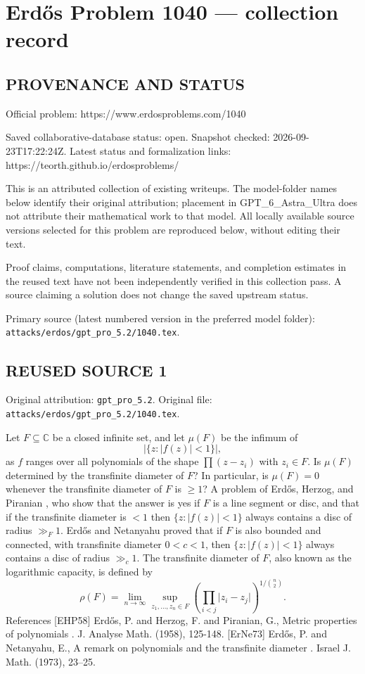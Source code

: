 \section*{Erd\H{o}s Problem 1040 --- collection record}

\subsection*{PROVENANCE AND STATUS}
Official problem: https://www.erdosproblems.com/1040

Saved collaborative-database status: open.
Snapshot checked: 2026-09-23T17:22:24Z.
Latest status and formalization links: https://teorth.github.io/erdosproblems/

This is an attributed collection of existing writeups. The model-folder names below identify their original attribution; placement in GPT\_6\_Astra\_Ultra does not attribute their mathematical work to that model. All locally available source versions selected for this problem are reproduced below, without editing their text.

Proof claims, computations, literature statements, and completion estimates in the reused text have not been independently verified in this collection pass. A source claiming a solution does not change the saved upstream status.

Primary source (latest numbered version in the preferred model folder): \texttt{attacks/erdos/gpt\_pro\_5.2/1040.tex}.

\subsection*{REUSED SOURCE 1}
Original attribution: \texttt{gpt\_pro\_5.2}.
Original file: \texttt{attacks/erdos/gpt\_pro\_5.2/1040.tex}.


Let $F\subseteq \mathbb{C}$ be a closed infinite set, and let $\mu(F)$ be the infimum of\[\lvert \{ z: \lvert f(z)\rvert < 1\}\rvert,\]as $f$ ranges over all polynomials of the shape $\prod (z-z_i)$ with $z_i\in F$. Is $\mu(F)$ determined by the transfinite diameter of $F$? In particular, is $\mu(F)=0$ whenever the transfinite diameter of $F$ is $\geq 1$? A problem of Erd\H{o}s, Herzog, and Piranian \cite{EHP58}, who show that the answer is yes if $F$ is a line segment or disc, and that if the transfinite diameter is $<1$ then $\{ z: \lvert f(z)\rvert < 1\}$ always contains a disc of radius $\gg_F 1$. Erd\H{o}s and Netanyahu \cite{ErNe73} proved that if $F$ is also bounded and connected, with transfinite diameter $0<c<1$, then $\{ z: \lvert f(z)\rvert < 1\}$ always contains a disc of radius $\gg_c 1$. The transfinite diameter of $F$, also known as the logarithmic capacity, is defined by\[\rho(F)=\lim_{n\to \infty}\sup_{z_1,\ldots,z_n\in F}\left(\prod_{i<j}\lvert z_i-z_j\rvert\right)^{1/\binom{n}{2}}.\] References [EHP58] Erd\H{o}s, P. and Herzog, F. and Piranian, G., Metric properties of polynomials . J. Analyse Math. (1958), 125-148. [ErNe73] Erd\H{o}s, P. and Netanyahu, E., A remark on polynomials and the transfinite diameter . Israel J. Math. (1973), 23--25.



